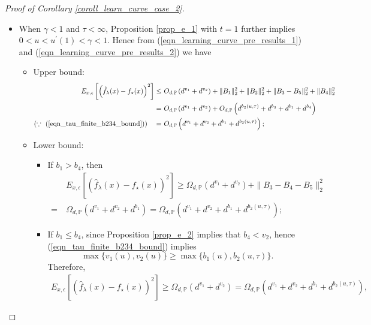 \documentclass{article}
\theoremstyle{plain}
\theoremstyle{definition}
\theoremstyle{remark}
\begin{document}
\begin{appendix}
\begin{proof}[Proof of Corollary \ref{coroll_learn_curve_case_2}]
\begin{itemize}
    \item[(b)] When $\gamma<1$ and $\tau<\infty$, Proposition \ref{prop_e_1} with $t=1$ further implies $0<u<u^{\prime}(1) <\gamma<1$. Hence from (\ref{eqn_learning_curve_pre_results_1}) and (\ref{eqn_learning_curve_pre_results_2}) we have
    \begin{itemize}
    \item Upper bound:
    \begin{align*}
E_{x, \epsilon} \left[ \left(\hat{f}_{\lambda}(x) - f_{\star}(x) \right)^{2} \right]
\leq &~ O_{d, \mathbb{P}} \left( d^{v_1} + d^{v_2}\right) + \|B_1\|_{2}^{2} + \|B_2\|_{2}^{2} + \|B_3 - B_5\|_{2}^{2} + \|B_4\|_{2}^{2}\\
= &~
O_{d, \mathbb{P}} \left( d^{v_1} + d^{v_2}\right) + O_{d, \mathbb{P}}\left( d^{b_2(u, \tau)}  + d^{b_3} + d^{b_1} + d^{b_4} \right)\\
(\because \text{ (\ref{eqn_tau_finite_b234_bound})}) \quad = &~ O_{d, \mathbb{P}} \left( d^{v_1} + d^{v_2} + d^{b_1} + d^{b_2(u, \tau)}\right);
\end{align*}

\item Lower bound:
    \begin{itemize}
        \item If $b_1>b_4$, then
\begin{align*}
&~E_{x, \epsilon} \left[ \left(\hat{f}_{\lambda}(x) - f_{\star}(x) \right)^{2} \right]
\geq  \Omega_{d, \mathbb{P}} \left( d^{v_1} + d^{v_2} \right) + \|B_3-B_4-B_5\|_{2}^{2}\\
=&~
\Omega_{d, \mathbb{P}} \left( d^{v_1} + d^{v_2} + d^{b_1}\right)=\Omega_{d, \mathbb{P}} \left( d^{v_1} + d^{v_2} + d^{b_1} + d^{b_2(u, \tau)}\right);
\end{align*}

\item If $b_1 \leq b_4$, since Proposition \ref{prop_e_2} implies that $b_4<v_2$, hence (\ref{eqn_tau_finite_b234_bound}) implies
\begin{equation*}
    \max\{v_1(u), v_2(u)\} \geq \max\{b_1(u), b_2(u, \tau)\}.
\end{equation*}
Therefore, 
\begin{align*}
E_{x, \epsilon} \left[ \left(\hat{f}_{\lambda}(x) - f_{\star}(x) \right)^{2} \right]
\geq
\Omega_{d, \mathbb{P}} \left( d^{v_1} + d^{v_2}\right)
=
\Omega_{d, \mathbb{P}} \left( d^{v_1} + d^{v_2} + d^{b_1} + d^{b_2(u, \tau)}\right),
\end{align*}


\end{itemize}
\end{itemize}
\end{itemize}
\end{proof}
\end{appendix}
\end{document}
